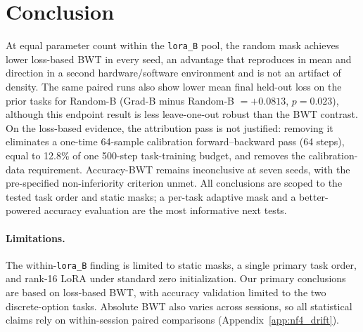 \section{Conclusion}
\label{sec:conclusion}

At equal parameter count within the \texttt{lora\_B} pool, the random mask achieves lower loss-based BWT in every seed, an advantage that reproduces in mean and direction in a second hardware/software environment and is not an artifact of density. The same paired runs also show lower mean final held-out loss on the prior tasks for Random-B (Grad-B minus Random-B $=+0.0813$, $p=0.023$), although this endpoint result is less leave-one-out robust than the BWT contrast. On the loss-based evidence, the attribution pass is not justified: removing it eliminates a one-time 64-sample calibration forward--backward pass (64 steps), equal to 12.8\% of one 500-step task-training budget, and removes the calibration-data requirement. Accuracy-BWT remains inconclusive at seven seeds, with the pre-specified non-inferiority criterion unmet. All conclusions are scoped to the tested task order and static masks; a per-task adaptive mask and a better-powered accuracy evaluation are the most informative next tests.

\paragraph{Limitations.}
\label{sec:limitations}

The within-\texttt{lora\_B} finding is limited to static masks,
a single primary task order, and rank-16 LoRA under standard
zero initialization. Our primary conclusions are based on loss-based
BWT, with accuracy validation limited to the two discrete-option tasks.
Absolute BWT also varies across sessions, so all statistical claims rely
on within-session paired comparisons (Appendix~\ref{app:nf4_drift}).
